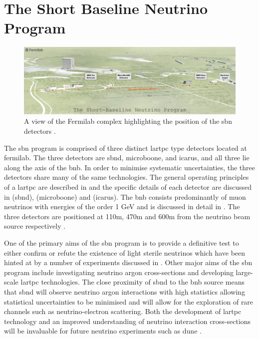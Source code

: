 \chapter{The Short Baseline Neutrino Program}
\label{chap:SBN Program}


\begin{figure}
    \centering
    \includegraphics[width = \hugefigwidth]{figures-chap3/SBN_program.jpg}
    \caption[SBN map.]{A view of the Fermilab complex highlighting the position of the \gls{sbn} detectors \cite{SBN_paper}.}
    \label{fig:sbn_complex}
\end{figure}

The \gls{sbn} program is comprised of three distinct \gls{lartpc} type detectors located at \gls{fermilab}. The three detectors are \gls{sbnd}, \gls{microboone}, and \gls{icarus}, and all three lie along the axis of the \gls{bnb}. In order to minimise systematic uncertainties, the three detectors share many of the same technologies. The general operating principles of a \gls{lartpc} are described in  and the specific details of each detector are discussed in  (\gls{sbnd}),  (\gls{microboone}) and  (\gls{icarus}). The \gls{bnb} consists predominantly of muon neutrinos with energies of the order 1 GeV and is discussed in detail in . The three detectors are positioned at 110m, 470m and 600m from the neutrino beam source respectively \cite{SBN_paper}. 

One of the primary aims of the \gls{sbn} program is to provide a definitive test to either confirm or refute the existence of light sterile neutrinos which have been hinted at by a number of experiments discussed in . Other major aims of the \gls{sbn} program include investigating neutrino argon cross-sections and developing large-scale \gls{lartpc} technologies. The close proximity of \gls{sbnd} to the \gls{bnb} source means that \gls{sbnd} will observe neutrino argon interactions with high statistics allowing statistical uncertainties to be minimised and will allow for the exploration of rare channels such as neutrino-electron scattering. Both the development of \gls{lartpc} technology and an improved understanding of neutrino interaction cross-sections will be invaluable for future neutrino experiments such as \gls{dune} \cite{SBN_paper}.


